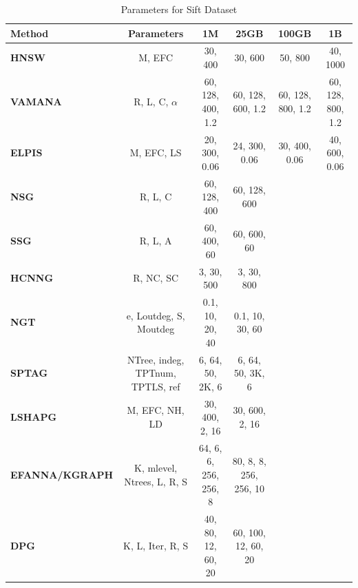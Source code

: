 \begin{table}[h!]
\centering
\caption{Parameters for Sift Dataset}
\scriptsize
\begin{tabularx}{\textwidth}{lCCCCC}
\toprule
\textbf{Method} & \textbf{Parameters} & \textbf{1M} & \textbf{25GB} & \textbf{100GB} & \textbf{1B} \\
\midrule
\textbf{HNSW} & M, EFC & 30, 400 & 30, 600 & 50, 800 & 40, 1000 \\
\textbf{VAMANA} & R, L, C, $\alpha$ & 60, 128, 400, 1.2 & 60, 128, 600, 1.2 & 60, 128, 800, 1.2 & 60, 128, 800, 1.2 \\
\textbf{ELPIS} & M, EFC, LS & 20, 300, 0.06 & 24, 300, 0.06 & 30, 400, 0.06 & 40, 600, 0.06 \\
\textbf{NSG} & R, L, C & 60, 128, 400 & 60, 128, 600 & & \\
\textbf{SSG} & R, L, A & 60, 400, 60 & 60, 600, 60 & & \\
\textbf{HCNNG} & R, NC, SC & 3, 30, 500 & 3, 30, 800 & & \\
\textbf{NGT} & e, Loutdeg, S, Moutdeg & 0.1, 10, 20, 40 & 0.1, 10, 30, 60 & & \\
\textbf{SPTAG} & NTree, indeg, TPTnum, TPTLS, ref & 6, 64, 50, 2K, 6 & 6, 64, 50, 3K, 6 & & \\
\textbf{LSHAPG} & M, EFC, NH, LD & 30, 400, 2, 16 & 30, 600, 2, 16 & & \\
\textbf{EFANNA/KGRAPH} & K, mlevel, Ntrees, L, R, S & 64, 6, 6, 256, 256, 8 & 80, 8, 8, 256, 256, 10 & & \\
\textbf{DPG} & K, L, Iter, R, S & 40, 80, 12, 60, 20 & 60, 100, 12, 60, 20 & & \\
\bottomrule
\end{tabularx}
\end{table}


